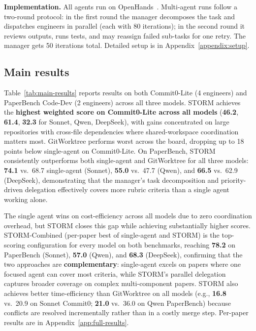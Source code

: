 \documentclass{article}
\begin{document}
\textbf{Implementation.} All agents run on OpenHands~\citep{openhands}. Multi-agent runs follow a two-round protocol: in the first round the manager decomposes the task and dispatches engineers in parallel (each with 80 iterations); in the second round it reviews outputs, runs tests, and may reassign failed sub-tasks for one retry. The manager gets 50 iterations total. Detailed setup is in Appendix~\ref{appendix:setup}.

\subsection{Main results}

Table~\ref{tab:main-results} reports results on both Commit0-Lite (4 engineers) and PaperBench Code-Dev (2 engineers) across all three models. STORM achieves the \textbf{highest weighted score on Commit0-Lite across all models} (\textbf{46.2}, \textbf{61.4}, \textbf{32.3} for Sonnet, Qwen, DeepSeek), with gains concentrated on large repositories with cross-file dependencies where shared-workspace coordination matters most. GitWorktree performs worst across the board, dropping up to 18 points below single-agent on Commit0-Lite. On PaperBench, STORM consistently outperforms both single-agent and GitWorktree for all three models: \textbf{74.1} vs.\ 68.7 single-agent (Sonnet), \textbf{55.0} vs.\ 47.7 (Qwen), and \textbf{66.5} vs.\ 62.9 (DeepSeek), demonstrating that the manager's task decomposition and priority-driven delegation effectively covers more rubric criteria than a single agent working alone.

The single agent wins on cost-efficiency across all models due to zero coordination overhead, but STORM closes this gap while achieving substantially higher scores. STORM-Combined (per-paper best of single-agent and STORM) is the top-scoring configuration for every model on both benchmarks, reaching \textbf{78.2} on PaperBench (Sonnet), \textbf{57.0} (Qwen), and \textbf{68.3} (DeepSeek), confirming that the two approaches are \textbf{complementary}: single-agent excels on papers where one focused agent can cover most criteria, while STORM's parallel delegation captures broader coverage on complex multi-component papers. STORM also achieves better time-efficiency than GitWorktree on all models (e.g., \textbf{16.8} vs.\ 20.9 on Sonnet Commit0; \textbf{21.0} vs.\ 36.0 on Qwen PaperBench) because conflicts are resolved incrementally rather than in a costly merge step. Per-paper results are in Appendix~\ref{app:full-results}.
\end{document}

